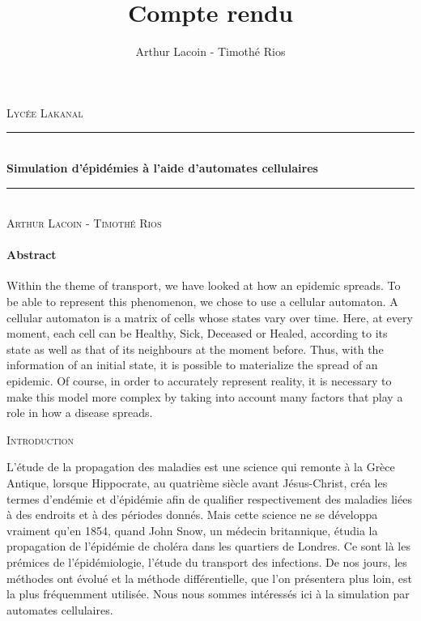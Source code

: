 \documentclass{article}
\title{Compte rendu}
\author{Arthur Lacoin - Timothé Rios}
\date{}
\newcommand{\HRule}{\rule{\linewidth}{0.5mm}}
\begin{document}
\begin{titlepage}
    \begin{sffamily}
    \begin{center}

        \textsc{\LARGE Lycée Lakanal}~\\[2cm]

        \HRule \\[0.4cm]
        { \huge \bfseries Simulation d'épidémies à l'aide d'automates cellulaires\\[0.4cm] }
        \HRule \\[2cm]
        \textsc{\Large Arthur Lacoin - Timothé Rios}\\[2cm]

    \end{center}
\end{sffamily}
\end{titlepage}

\tableofcontents

\newpage
\paragraph{Abstract\\}
	Within the theme of transport, we have looked at how an epidemic spreads. To be able to represent this phenomenon, we chose to use a cellular automaton. A cellular automaton is a matrix of cells whose states vary over time. Here, at every moment, each cell can be Healthy, Sick, Deceased or Healed, according to its state as well as that of its neighbours at the moment before. Thus, with the information of an initial state, it is possible to materialize the spread of an epidemic. Of course, in order to accurately represent reality, it is necessary to make this model more complex by taking into account many factors that play a role in how a disease spreads.\\[2cm]
	
\begin{center}
\textsc{Introduction}~\\[1cm]
\end{center}

	L'étude de la propagation des maladies est une science qui remonte à la Grèce Antique, lorsque Hippocrate, au quatrième siècle avant Jésus-Christ, créa les termes d'endémie et d'épidémie afin de qualifier respectivement des maladies liées à des endroits et à des périodes donnés. Mais cette science ne se développa vraiment qu'en 1854, quand John Snow, un médecin britannique, étudia la propagation de l'épidémie de choléra dans les quartiers de Londres. Ce sont là les prémices de l'épidémiologie, l'étude du transport des infections. De nos jours, les méthodes ont évolué et la méthode différentielle, que l'on présentera plus loin, est la plus fréquemment utilisée. Nous nous sommes intéressés ici à la simulation par automates cellulaires.
\end{document}

